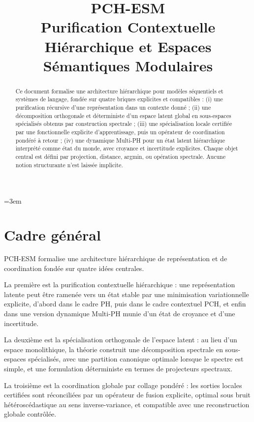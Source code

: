 \documentclass[11pt,a4paper]{article}
\title{PCH-ESM\\
\large Purification Contextuelle Hiérarchique et Espaces Sémantiques Modulaires}
\author{}
\date{}
\newcommand{\1}{\mathbf 1}
\begin{document}
\emergencystretch=3em
\maketitle

\begin{abstract}
Ce document formalise une architecture hiérarchique pour modèles séquentiels et systèmes de langage, fondée sur quatre briques explicites et compatibles :
(i) une purification récursive d'une représentation dans un contexte donné ;
(ii) une décomposition orthogonale et déterministe d'un espace latent global en sous-espaces spécialisés obtenus par construction spectrale ;
(iii) une spécialisation locale certifiée par une fonctionnelle explicite d'apprentissage, puis un opérateur de coordination pondéré à retour ;
(iv) une dynamique Multi-PH pour un état latent hiérarchique interprété comme état du monde, avec croyance et incertitude explicites.
Chaque objet central est défini par projection, distance, argmin, ou opération spectrale. Aucune notion structurante n'est laissée implicite.
\end{abstract}

\tableofcontents

\section{Cadre général}


PCH-ESM formalise une architecture hiérarchique de représentation et de coordination fondée sur quatre idées centrales.

La première est la purification contextuelle hiérarchique : une représentation latente peut être ramenée vers un état stable par une minimisation variationnelle explicite, d’abord dans le cadre PH, puis dans le cadre contextuel PCH, et enfin dans une version dynamique Multi-PH munie d’un état de croyance et d’une incertitude.

La deuxième est la spécialisation orthogonale de l’espace latent : au lieu d’un espace monolithique, la théorie construit une décomposition spectrale en sous-espaces spécialisés, avec une partition canonique optimale lorsque le spectre est simple, et une formulation déterministe en termes de projecteurs spectraux.

La troisième est la coordination globale par collage pondéré : les sorties locales certifiées sont réconciliées par un opérateur de fusion explicite, optimal sous bruit hétéroscédastique au sens inverse-variance, et compatible avec une reconstruction globale contrôlée.
\end{document}
